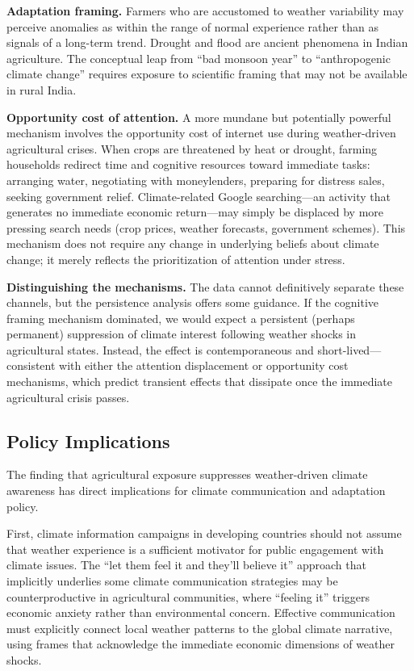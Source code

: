 \documentclass[12pt]{article}
\begin{document}
\textbf{Adaptation framing.} Farmers who are accustomed to weather variability may perceive anomalies as within the range of normal experience rather than as signals of a long-term trend. Drought and flood are ancient phenomena in Indian agriculture. The conceptual leap from ``bad monsoon year'' to ``anthropogenic climate change'' requires exposure to scientific framing that may not be available in rural India.

\textbf{Opportunity cost of attention.} A more mundane but potentially powerful mechanism involves the opportunity cost of internet use during weather-driven agricultural crises. When crops are threatened by heat or drought, farming households redirect time and cognitive resources toward immediate tasks: arranging water, negotiating with moneylenders, preparing for distress sales, seeking government relief. Climate-related Google searching---an activity that generates no immediate economic return---may simply be displaced by more pressing search needs (crop prices, weather forecasts, government schemes). This mechanism does not require any change in underlying beliefs about climate change; it merely reflects the prioritization of attention under stress.

\textbf{Distinguishing the mechanisms.} The data cannot definitively separate these channels, but the persistence analysis offers some guidance. If the cognitive framing mechanism dominated, we would expect a persistent (perhaps permanent) suppression of climate interest following weather shocks in agricultural states. Instead, the effect is contemporaneous and short-lived---consistent with either the attention displacement or opportunity cost mechanisms, which predict transient effects that dissipate once the immediate agricultural crisis passes.

\subsection{Policy Implications}

The finding that agricultural exposure suppresses weather-driven climate awareness has direct implications for climate communication and adaptation policy.

First, climate information campaigns in developing countries should not assume that weather experience is a sufficient motivator for public engagement with climate issues. The ``let them feel it and they'll believe it'' approach that implicitly underlies some climate communication strategies may be counterproductive in agricultural communities, where ``feeling it'' triggers economic anxiety rather than environmental concern. Effective communication must explicitly connect local weather patterns to the global climate narrative, using frames that acknowledge the immediate economic dimensions of weather shocks.
\end{document}
